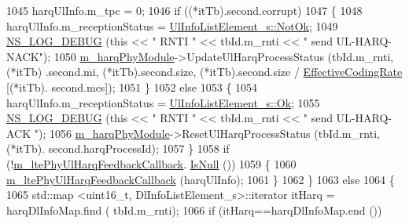 \begin{DoxyCode}
1045                         harqUlInfo.m\_tpc = 0;
1046                         \textcolor{keywordflow}{if} ((*itTb).second.corrupt)
1047                           \{
1048                             harqUlInfo.m\_receptionStatus = 
      \hyperlink{structns3_1_1UlInfoListElement__s_a2a4dff5145d25c81086660e991db6f61a98aed738fd24811d3461668e394a53c8}{UlInfoListElement\_s::NotOk};
1049                             \hyperlink{group__logging_ga413f1886406d49f59a6a0a89b77b4d0a}{NS\_LOG\_DEBUG} (\textcolor{keyword}{this} << \textcolor{stringliteral}{" RNTI "} << tbId.m\_rnti << \textcolor{stringliteral}{" send
       UL-HARQ-NACK"});
1050                             \hyperlink{classns3_1_1LteSpectrumPhy_a6febfefe8b9da4a5559c5bb08bf77f26}{m\_harqPhyModule}->UpdateUlHarqProcessStatus (tbId.m\_rnti, (*itTb)
      .second.mi, (*itTb).second.size, (*itTb).second.size / \hyperlink{namespacens3_af70af4887722b3badf3d57ca573d9502}{EffectiveCodingRate} [(*itTb).
      second.mcs]);
1051                           \}
1052                         \textcolor{keywordflow}{else}
1053                           \{
1054                             harqUlInfo.m\_receptionStatus = 
      \hyperlink{structns3_1_1UlInfoListElement__s_a2a4dff5145d25c81086660e991db6f61a0a8fd1f9d7e6ac1517a35ec3be5b2b65}{UlInfoListElement\_s::Ok};
1055                             \hyperlink{group__logging_ga413f1886406d49f59a6a0a89b77b4d0a}{NS\_LOG\_DEBUG} (\textcolor{keyword}{this} << \textcolor{stringliteral}{" RNTI "} << tbId.m\_rnti << \textcolor{stringliteral}{" send UL-HARQ-ACK
      "});
1056                             \hyperlink{classns3_1_1LteSpectrumPhy_a6febfefe8b9da4a5559c5bb08bf77f26}{m\_harqPhyModule}->ResetUlHarqProcessStatus (tbId.m\_rnti, (*itTb).
      second.harqProcessId);
1057                           \}
1058                           \textcolor{keywordflow}{if} (!\hyperlink{classns3_1_1LteSpectrumPhy_a24f82f31791f4e60d1e6d9927b35380d}{m\_ltePhyUlHarqFeedbackCallback}.
      \hyperlink{classns3_1_1Callback_aa8e27826badbf37f84763f36f70d9b54}{IsNull} ())
1059                             \{
1060                               \hyperlink{classns3_1_1LteSpectrumPhy_a24f82f31791f4e60d1e6d9927b35380d}{m\_ltePhyUlHarqFeedbackCallback} (harqUlInfo);
1061                             \}
1062                       \}
1063                     \textcolor{keywordflow}{else}
1064                       \{
1065                         std::map <uint16\_t, DlInfoListElement\_s>::iterator itHarq = harqDlInfoMap.find (
      tbId.m\_rnti);
1066                         \textcolor{keywordflow}{if} (itHarq==harqDlInfoMap.end ())

\end{DoxyCode}
